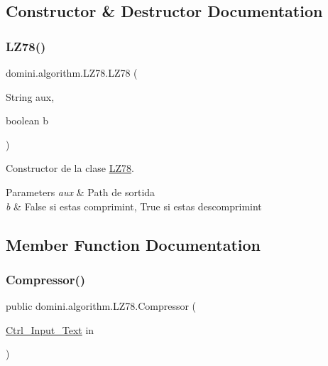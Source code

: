 \subsection{Constructor \& Destructor Documentation}
\mbox{\label{classdomini_1_1algorithm_1_1LZ78_afb5950cfc6a4887611298f6c1fd83d26}} 
\subsubsection{\texorpdfstring{L\+Z78()}{LZ78()}}
{\footnotesize\ttfamily domini.\+algorithm.\+L\+Z78.\+L\+Z78 (\begin{DoxyParamCaption}\item[{String}]{aux,  }\item[{boolean}]{b }\end{DoxyParamCaption})\hspace{0.3cm}{\ttfamily [inline]}}



Constructor de la clase \hyperlink{classdomini_1_1algorithm_1_1LZ78}{L\+Z78}. 


\begin{DoxyParams}{Parameters}
{\em aux} & Path de sortida \\
\hline
{\em b} & False si estas comprimint, True si estas descomprimint \\
\hline
\end{DoxyParams}


\subsection{Member Function Documentation}
\mbox{\label{classdomini_1_1algorithm_1_1LZ78_a545765a19a5eeababaeeee20fc480116}} 
\subsubsection{\texorpdfstring{Compressor()}{Compressor()}}
{\footnotesize\ttfamily public domini.\+algorithm.\+L\+Z78.\+Compressor (\begin{DoxyParamCaption}\item[{\hyperlink{classpersistencia_1_1input_1_1Ctrl__Input__Text}{Ctrl\+\_\+\+Input\+\_\+\+Text}}]{in }\end{DoxyParamCaption})\hspace{0.3cm}{\ttfamily [inline]}}




